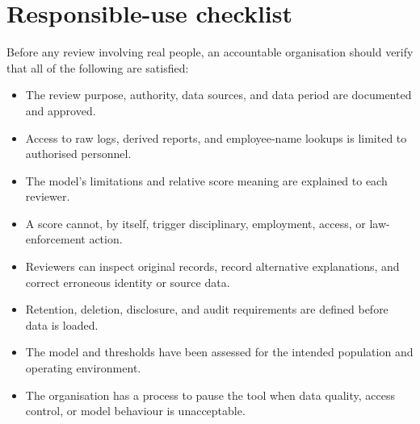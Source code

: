 \documentclass[12pt,a4paper,oneside]{report}
\begin{document}
\section{Responsible-use checklist}
\label{app:responsible-use}
Before any review involving real people, an accountable organisation
should verify that all of the following are satisfied:
\begin{itemize}
  \item The review purpose, authority, data sources, and data period are
  documented and approved.
  \item Access to raw logs, derived reports, and employee-name lookups
  is limited to authorised personnel.
  \item The model's limitations and relative score meaning are
  explained to each reviewer.
  \item A score cannot, by itself, trigger disciplinary, employment,
  access, or law-enforcement action.
  \item Reviewers can inspect original records, record alternative
  explanations, and correct erroneous identity or source data.
  \item Retention, deletion, disclosure, and audit requirements are
  defined before data is loaded.
  \item The model and thresholds have been assessed for the intended
  population and operating environment.
  \item The organisation has a process to pause the tool when data
  quality, access control, or model behaviour is unacceptable.
\end{itemize}
\end{document}
